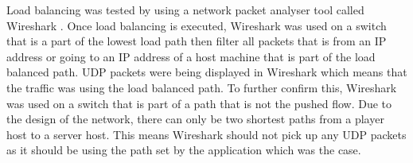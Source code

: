 \newline
\par
Load balancing was tested by using a network packet analyser tool called Wireshark \cite{wireshark}. Once load balancing is executed, Wireshark was used on a switch that is a part of the lowest load path then filter all packets that is from an IP address or going to an IP address of a host machine that is part of the load balanced path. UDP packets were being displayed in Wireshark which means that the traffic was using the load balanced path. To further confirm this, Wireshark was used on a switch that is part of a path that is not the pushed flow. Due to the design of the network, there can only be two shortest paths from a player host to a server host. This means Wireshark should not pick up any UDP packets as it should be using the path set by the application which was the case. 